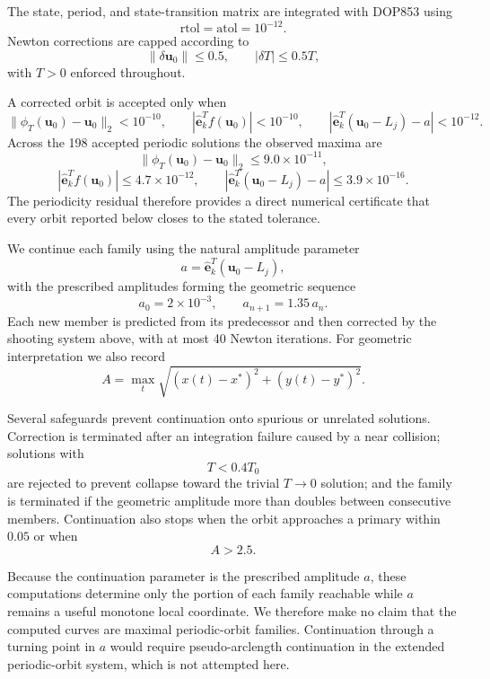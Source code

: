 The state, period, and state-transition matrix are integrated with DOP853
using
\[
\mathrm{rtol}=\mathrm{atol}=10^{-12}.
\]
Newton corrections are capped according to
\[
\|\delta\mathbf u_0\|\leq0.5,
\qquad
|\delta T|\leq0.5T,
\]
with $T>0$ enforced throughout.

A corrected orbit is accepted only when
\begin{equation}
\|\phi_T(\mathbf u_0)-\mathbf u_0\|_2<10^{-10},
\qquad
|\widehat{\mathbf e}_k^T f(\mathbf u_0)|<10^{-10},
\qquad
|\widehat{\mathbf e}_k^T(\mathbf u_0-L_j)-a|<10^{-12}.
\label{eq:periodic_acceptance}
\end{equation}
Across the 198 accepted periodic solutions the observed maxima are
\[
\|\phi_T(\mathbf u_0)-\mathbf u_0\|_2
\leq9.0\times10^{-11},
\]
\[
|\widehat{\mathbf e}_k^T f(\mathbf u_0)|
\leq4.7\times10^{-12},
\qquad
|\widehat{\mathbf e}_k^T(\mathbf u_0-L_j)-a|
\leq3.9\times10^{-16}.
\]
The periodicity residual therefore provides a direct numerical certificate
that every orbit reported below closes to the stated tolerance.

We continue each family using the natural amplitude parameter
\[
a=
\widehat{\mathbf e}_k^T(\mathbf u_0-L_j),
\]
with the prescribed amplitudes forming the geometric sequence
\begin{equation}
a_0=2\times10^{-3},
\qquad
a_{n+1}=1.35\,a_n.
\label{eq:amplitude_sequence}
\end{equation}
Each new member is predicted from its predecessor and then corrected by the
shooting system above, with at most 40 Newton iterations. For geometric
interpretation we also record
\[
A=
\max_t
\sqrt{(x(t)-x^\ast)^2+(y(t)-y^\ast)^2}.
\]

Several safeguards prevent continuation onto spurious or unrelated
solutions. Correction is terminated after an integration failure caused by
a near collision; solutions with
\[
T<0.4T_0
\]
are rejected to prevent collapse toward the trivial $T\rightarrow0$
solution; and the family is terminated if the geometric amplitude more than
doubles between consecutive members. Continuation also stops when the orbit
approaches a primary within $0.05$ or when
\[
A>2.5.
\]

Because the continuation parameter is the prescribed amplitude $a$, these
computations determine only the portion of each family reachable while $a$
remains a useful monotone local coordinate. We therefore make no claim that
the computed curves are maximal periodic-orbit families. Continuation
through a turning point in $a$ would require pseudo-arclength continuation
in the extended periodic-orbit system, which is not attempted here.

